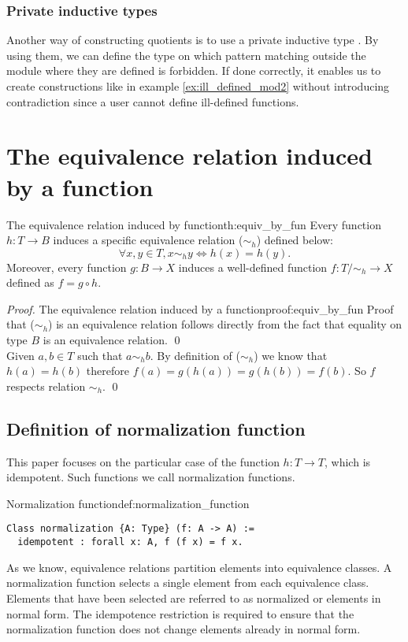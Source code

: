 \subsubsection{Private inductive types}
Another way of constructing quotients is to use a private inductive type \cite{PrivetInductive}. By using them, we can define the type on which pattern matching outside the module where they are defined is forbidden. If done correctly, it enables us to create constructions like in example \ref{ex:ill_defined_mod2} without introducing contradiction since a user cannot define ill-defined functions.

\section{The equivalence relation induced by a function}
\begin{theo}{The equivalence relation induced by function}{th:equiv_by_fun}
Every function $h: T \rightarrow B$ induces a specific equivalence relation ($\sim_h$) defined below:
$$ \forall x, y \in T, x \sim_h y \iff h(x) = h(y). $$
Moreover, every function $g: B \rightarrow X$ induces a well-defined function $f : T/\sim_h \rightarrow X$ defined as $f = g \circ h$. 
\end{theo}

\begin{proof}{The equivalence relation induced by a function}{proof:equiv_by_fun}
Proof that ($\sim_h$) is an equivalence relation follows directly from the fact that equality on type $B$ is an equivalence relation. \qed \\ 
Given $a, b \in T$ such that $a \sim_h b$. By definition of ($\sim_h$) we know that $h(a) = h(b)$ therefore $f(a) = g(h(a)) = g(h(b)) = f(b)$. So $f$ respects relation $\sim_h$. \qed
\end{proof}
\subsection{Definition of normalization function}
This paper focuses on the particular case of the function $h: T \rightarrow T$, which is idempotent. Such functions we call normalization functions.
\begin{defi}{Normalization function}{def:normalization_function}
\begin{verbatim}
Class normalization {A: Type} (f: A -> A) := 
  idempotent : forall x: A, f (f x) = f x.
\end{verbatim}
\end{defi}
As we know, equivalence relations partition elements into equivalence classes. A normalization function selects a single element from each equivalence class. Elements that have been selected are referred to as normalized or elements in normal form. The idempotence restriction is required to ensure that the normalization function does not change elements already in normal form.


